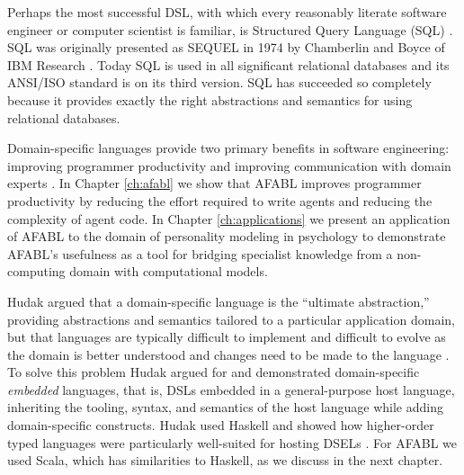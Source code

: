 Perhaps the most successful DSL, with which every reasonably literate software engineer or computer scientist is familiar, is Structured Query Language (SQL) \cite{}. SQL was originally presented as SEQUEL in 1974 by Chamberlin and Boyce of IBM Research \cite{chamberlin1974sequel}. Today SQL is used in all significant relational databases and its ANSI/ISO standard is on its third version. SQL has succeeded so completely because it provides exactly the right abstractions and semantics for using relational databases.

Domain-specific languages provide two primary benefits in software engineering: improving programmer productivity and improving communication with domain experts \cite{fowler2011domain}. In Chapter \ref{ch:afabl} we show that AFABL improves programmer productivity by reducing the effort required to write agents and reducing the complexity of agent code. In Chapter \ref{ch:applications} we present an application of AFABL to the domain of personality modeling in psychology to demonstrate AFABL's usefulness as a tool for bridging specialist knowledge from a non-computing domain with computational models.

Hudak argued that a domain-specific language is the ``ultimate abstraction,'' providing abstractions and semantics tailored to a particular application domain, but that languages are typically difficult to implement and difficult to evolve as the domain is better understood and changes need to be made to the language \cite{hudak1996building}. To solve this problem Hudak argued for and demonstrated domain-specific {\it embedded} languages, that is, DSLs embedded in a general-purpose host language, inheriting the tooling, syntax, and semantics of the host language while adding domain-specific constructs. Hudak used Haskell and showed how higher-order typed languages were particularly well-suited for hosting DSELs \cite{hudak1998modular}. For AFABL we used Scala, which has similarities to Haskell, as we discuss in the next chapter.

